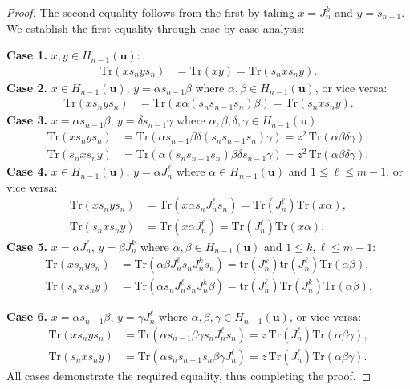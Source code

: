 \documentclass[a4paper, oneside]{amsart}
\numberwithin{equation}{section}
\theoremstyle{definition}
\theoremstyle{remark}
\begin{document}
\begin{proof}
The second equality follows from the first by taking $x = J_n^k$ and $y = s_{n-1}$. We establish the first equality through case by case analysis:

\noindent\textbf{Case 1.} $x,y \in H_{n-1}(\boldsymbol{u})$:
\begin{align*}
    \mathrm{Tr}(xs_nys_n) &= \mathrm{Tr}(xy) = \mathrm{Tr}(s_nxs_ny).
\end{align*}
\noindent\textbf{Case 2.} $x \in H_{n-1}(\boldsymbol{u})$, $y = \alpha s_{n-1}\beta$ where $\alpha,\beta\in H_{n-1}(\boldsymbol{u})$, or vice versa:
\begin{align*}
    \mathrm{Tr}(xs_nys_n) &=\mathrm{Tr}(x\alpha(s_ns_{n-1}s_n)\beta)=\mathrm{Tr}(s_nxs_ny).
\end{align*}
\noindent\textbf{Case 3.} $x = \alpha s_{n-1}\beta$, $y = \delta s_{n-1}\gamma$ where $\alpha,\beta,\delta,\gamma\in H_{n-1}(\boldsymbol{u})$:
\begin{align*}
    \mathrm{Tr}(xs_nys_n) &=\mathrm{Tr}(\alpha s_{n-1}\beta\delta(s_ns_{n-1}s_n)\gamma)= z^2\,\mathrm{Tr}(\alpha\beta\delta\gamma), \\
    \mathrm{Tr}(s_nxs_ny) &=\mathrm{Tr}(\alpha (s_ns_{n-1}s_n)\beta\delta s_{n-1}\gamma)= z^2\,\mathrm{Tr}(\alpha\beta\delta\gamma).
\end{align*}
\noindent\textbf{Case 4.} $x \in H_{n-1}(\boldsymbol{u})$, $y = \alpha J_n^{\ell}$ where $\alpha\in H_{n-1}(\boldsymbol{u})$ and $1\leq\ell\leq m-1$, or vice versa:
\begin{align*}
    \mathrm{Tr}(xs_nys_n)&=\mathrm{Tr}(x\alpha s_nJ_n^{\ell}s_n)=
    \mathrm{Tr}(J_n^{\ell})\mathrm{Tr}(x\alpha), \\
    \mathrm{Tr}(s_nxs_ny) &=\mathrm{Tr}(x\alpha J_n^{\ell})= \mathrm{Tr}(J_n^{\ell})\mathrm{Tr}(x\alpha).
\end{align*}
\noindent\textbf{Case 5.} $x = \alpha J_n^{\ell}$, $y = \beta J_n^k$ where $\alpha,\beta\in H_{n-1}(\boldsymbol{u})$ and $1\leq k, \ell\leq m-1$:
\begin{align*}
 \mathrm{Tr}(xs_nys_n)&= \mathrm{Tr}(\alpha\beta J_n^{\ell}s_nJ_n^ks_n)=\mathrm{tr}(J_n^{k})\mathrm{tr}(J_n^{\ell})\mathrm{Tr}(\alpha\beta), \\
\mathrm{Tr}(s_nxs_ny)&= \mathrm{Tr}(\alpha s_nJ_n^{\ell}s_nJ_n^k\beta)=\mathrm{tr}(J_n^{\ell})\mathrm{Tr}(J_n^k)\mathrm{Tr}(\alpha\beta).
\end{align*}

\noindent\textbf{Case 6.} $x = \alpha s_{n-1}\beta$, $y = \gamma J_n^{\ell}$ where $\alpha,\beta,\gamma\in H_{n-1}(\boldsymbol{u})$, or vice versa:
\begin{align*}
    \mathrm{Tr}(xs_nys_n) &=\mathrm{Tr}(\alpha s_{n-1}\beta\gamma s_n J_n^{\ell}s_n)= z\,\mathrm{Tr}(J_n^{\ell})\mathrm{Tr}(\alpha\beta\gamma), \\
    \mathrm{Tr}(s_nxs_ny) &=\mathrm{Tr}(\alpha s_ns_{n-1}s_n\beta\gamma J_n^{\ell})= z\,\mathrm{Tr}(J_n^{\ell})\mathrm{Tr}(\alpha\beta\gamma).
\end{align*}
All cases demonstrate the required equality, thus completing the proof.
\end{proof}
\end{document}
